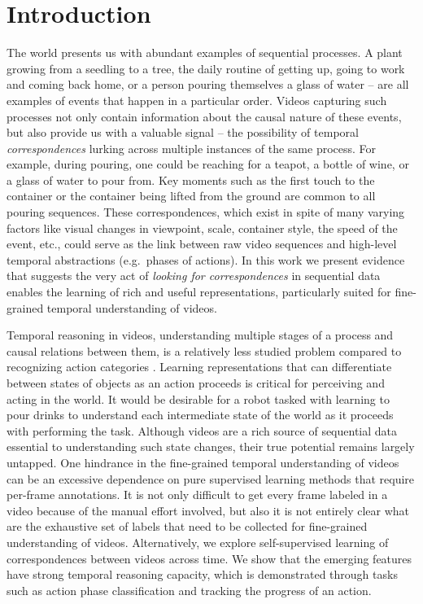 \documentclass[10pt,twocolumn,letterpaper]{article}
\begin{document}
\section{Introduction}
The world presents us with abundant examples of sequential processes. A plant growing from a seedling to a tree, the daily routine of getting up, going to work and coming back home, or a person pouring themselves a glass of water -- are all examples of events that happen in a particular order. Videos capturing such processes not only contain information about the causal nature of these events, but also provide us with a valuable signal -- the possibility of temporal \textit{correspondences} lurking across multiple instances of the same process. 
For example, during pouring, one could be reaching for a teapot, a bottle of wine, or a glass of water to pour from. Key moments such as the first touch to the container or the container being lifted from the ground are common to all pouring sequences. These correspondences, which exist in spite of many varying factors like visual changes in viewpoint, scale, container style, the speed of the event, etc., could serve as the link between raw video sequences and high-level temporal abstractions (e.g.\ phases of actions). In this work we present evidence that suggests the very act of \textit{looking for correspondences} in sequential data enables the learning of rich and useful representations, particularly suited for fine-grained temporal understanding of videos. 


Temporal reasoning in videos, understanding multiple stages of a process and causal relations between them, is a relatively less studied problem compared to recognizing action categories \cite{carreira2017quo,soomro2012ucf101}. Learning representations that can differentiate between states of objects as an action proceeds is critical for perceiving and acting in the world. It would be desirable for a robot tasked with learning to pour drinks to understand each intermediate state of the world as it proceeds with performing the task. Although videos are a rich source of sequential data essential to understanding such state changes, their true potential remains largely untapped. One hindrance in the fine-grained temporal understanding of videos can be an excessive dependence on pure supervised learning methods that require per-frame annotations. It is not only difficult to get every frame labeled in a video because of the manual effort involved, but also it is not entirely clear what are the exhaustive set of labels that need to be collected for fine-grained understanding of videos. Alternatively, we explore self-supervised learning of correspondences between videos across time. We show that the emerging features have strong temporal reasoning capacity, which is demonstrated through tasks such as action phase classification and tracking the progress of an action.   
\end{document}
